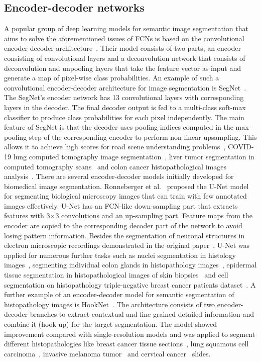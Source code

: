 \subsection{Encoder-decoder networks}
A popular group of deep learning models for semantic image segmentation that aims to solve the aforementioned issues of FCNs is based on the convolutional encoder-decoder architecture~\cite{noh2015learning}. Their model consists of two parts, an encoder consisting of convolutional layers and a deconvolution network that consists of deconvolution and unpooling layers that take the feature vector as input and generate a map of pixel-wise class probabilities. An example of such a convolutional encoder-decoder architecture for image segmentation is SegNet~\cite{badrinarayanan2017segnet}. The SegNet's encoder network has 13 convolutional layers with corresponding layers in the decoder. The final decoder output is fed to a multi-class soft-max classifier to produce class probabilities for each pixel independently. The main feature of SegNet is that the decoder uses pooling indices computed in the max-pooling step of the corresponding encoder to perform non-linear upsampling. This allows it to achieve high scores for road scene understanding problems~\cite{badrinarayanan2017segnet}, COVID-19 lung computed tomography image segmentation~\cite{saood2021covid}, liver tumor segmentation in computed tomography scans~\cite{almotairi2020liver} and colon cancer histopathological images analysis~\cite{hamida2021deep}. There are several encoder-decoder models initially developed for biomedical image segmentation. Ronneberger et al.~\cite{10.1007/978-3-319-24574-4_28} proposed the U-Net model for segmenting biological microscopy images that can train with few annotated images effectively. U-Net has an FCN-like down-sampling part that extracts features with 3$\times$3 convolutions and an up-sampling part. Feature maps from the encoder are copied to the corresponding decoder part of the network to avoid losing pattern information. Besides the segmentation of neuronal structures in electron microscopic recordings demonstrated in the original paper~\cite{10.1007/978-3-319-24574-4_28}, U-Net was applied for numerous further tasks such as nuclei segmentation in histology images~\cite{lagree2021review, zeng2019ric}, segmenting individual colon glands in histopathology images~\cite{pinckaers2019neural}, epidermal tissue segmentation in histopathological images of skin biopsies~\cite{oskal2019u} and cell segmentation on histopathology triple-negative breast cancer patients dataset~\cite{bagdigen2020cell}. A further example of an encoder-decoder model for semantic segmentation of histopathology images is HookNet~\cite{van2021hooknet}. The architecture consists of two encoder-decoder branches to extract contextual and fine-grained detailed information and combine it (hook up) for the target segmentation. The model showed improvement compared with single-resolution models and was applied to segment different histopathologies like breast cancer tissue sections~\cite{van2021hooknet}, lung squamous cell carcinoma~\cite{van2021hooknet}, invasive melanoma tumor~\cite{shahdeep} and cervical cancer~\cite{meng2021cervical} slides.

